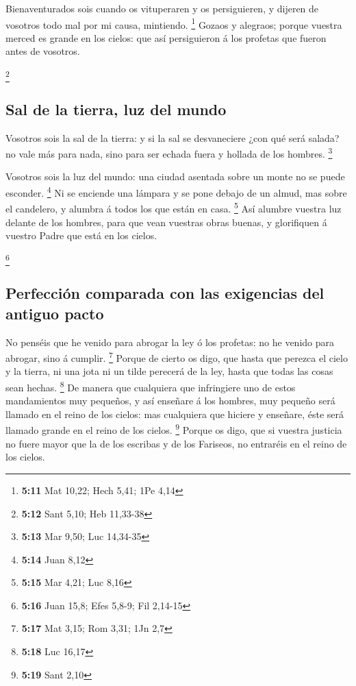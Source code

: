  Bienaventurados sois cuando os vituperaren y os
persiguieren, y dijeren de vosotros todo mal por mi causa, mintiendo.
\footnote{\textbf{5:11} Mat 10,22; Hech 5,41; 1Pe 4,14} 
Gozaos y alegraos; porque vuestra merced es grande en los cielos: que
así persiguieron á los profetas que fueron antes de vosotros.

\footnote{\textbf{5:12} Sant 5,10; Heb 11,33-38}

\hypertarget{sal-de-la-tierra-luz-del-mundo}{%
\subsection{Sal de la tierra, luz del
mundo}\label{sal-de-la-tierra-luz-del-mundo}}

 Vosotros sois la sal de la tierra: y si la sal se
desvaneciere ¿con qué será salada? no vale más para nada, sino para ser
echada fuera y hollada de los hombres. \footnote{\textbf{5:13} Mar 9,50;
  Luc 14,34-35}

 Vosotros sois la luz del mundo: una ciudad asentada
sobre un monte no se puede esconder. \footnote{\textbf{5:14} Juan 8,12}
 Ni se enciende una lámpara y se pone debajo de un almud,
mas sobre el candelero, y alumbra á todos los que están en casa.
\footnote{\textbf{5:15} Mar 4,21; Luc 8,16}  Así alumbre
vuestra luz delante de los hombres, para que vean vuestras obras buenas,
y glorifiquen á vuestro Padre que está en los cielos.

\footnote{\textbf{5:16} Juan 15,8; Efes 5,8-9; Fil 2,14-15}

\hypertarget{perfecciuxf3n-comparada-con-las-exigencias-del-antiguo-pacto}{%
\subsection{Perfección comparada con las exigencias del antiguo
pacto}\label{perfecciuxf3n-comparada-con-las-exigencias-del-antiguo-pacto}}

 No penséis que he venido para abrogar la ley ó los
profetas: no he venido para abrogar, sino á cumplir. \footnote{\textbf{5:17}
  Mat 3,15; Rom 3,31; 1Jn 2,7}  Porque de cierto os digo,
que hasta que perezca el cielo y la tierra, ni una jota ni un tilde
perecerá de la ley, hasta que todas las cosas sean hechas. \footnote{\textbf{5:18}
  Luc 16,17}  De manera que cualquiera que infringiere
uno de estos mandamientos muy pequeños, y así enseñare á los hombres,
muy pequeño será llamado en el reino de los cielos: mas cualquiera que
hiciere y enseñare, éste será llamado grande en el reino de los cielos.
\footnote{\textbf{5:19} Sant 2,10}  Porque os digo, que
si vuestra justicia no fuere mayor que la de los escribas y de los
Fariseos, no entraréis en el reino de los cielos.

